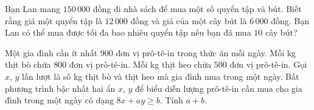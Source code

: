 \begin{bt}%
	Bạn Lan mang $150\,000$ đồng đi nhà sách để mua một số quyển tập và bút. Biết rằng giá một quyển tập là $12\,000$ đồng và giá của một cây bút là $6\,000$ đồng. Bạn Lan có thể mua được tối đa bao nhiêu quyển tập nếu bạn đã mua $10$ cây bút?
\end{bt}

\begin{bt}%
	Một gia đình cần ít nhất $900$ đơn vị prô-tê-in trong thức ăn mỗi ngày. Mỗi kg thịt bò chứa $800$ đơn vị prô-tê-in. Mỗi kg thịt heo chứa $500$ đơn vị prô-tê-in. Gọi $ x $, $ y $ lần lượt là số kg thịt bò và thịt heo mà gia đình mua trong một ngày. Bất phương trình bậc nhất hai ẩn $ x $, $ y $ để biểu diễn lượng prô-tê-in cần mua  cho gia đình trong một ngày có dạng $8x+ay\geq b$. Tính $a+b$.
\end{bt}

